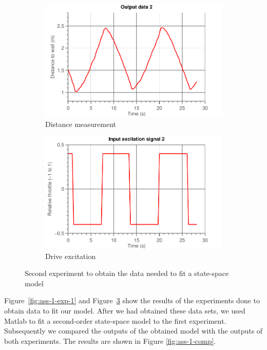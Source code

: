 \documentclass[11pt,titlepage]{report}
\begin{document}
\begin{figure}[H]
	\begin{subfigure}{.5\textwidth}
		\begin{center}
			\includegraphics[width=\linewidth]{resource/distances2.pdf}
		\end{center}
		\caption{Distance measurement}
		\label{fig:ass-1-dist-2}
	\end{subfigure}
	\begin{subfigure}{.5\textwidth}
		\begin{center}
			\includegraphics[width=\linewidth]{resource/drive-excitation2.pdf}
		\end{center}
		\caption{Drive excitation}
		\label{fig:ass-1-drive-2}
	\end{subfigure}
	\caption{Second experiment to obtain the data needed to fit a state-space model}
	\label{fig:ass-1-exp-2}
\end{figure}

Figure~\ref{fig:ass-1-exp-1} and Figure~\ref{fig:ass-1-exp-2} show the results of the experiments done to obtain data to fit our model. After we had obtained these data sets, we used Matlab to fit a second-order state-space model to the first experiment. Subsequently we compared the outputs of the obtained model with the outputs of both experiments. The results are shown in Figure \ref{fig:ass-1-comp}.
\end{document}
